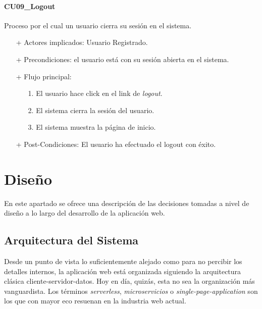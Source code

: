\documentclass[a4paper]{article}
\begin{document}
            \paragraph{CU09\_Logout}
                Proceso por el cual un usuario cierra su sesión en el sistema.
                \begin{itemize}
                    \item[+] Actores implicados: Usuario Registrado.
                    \item[+] Precondiciones: el usuario está con su sesión abierta en el sistema.
                    \item[+] Flujo principal:
                    \begin{enumerate}
                        \item[1.] El usuario hace click en el link de \emph{logout}.
                        \item[2.] El sistema cierra la sesión del usuario.
                        \item[3.] El sistema muestra la página de inicio.
                    \end{enumerate}
                    \item[+] Post-Condiciones: El usuario ha efectuado el logout con éxito.
                \end{itemize}

    \section{Diseño} \label{sec:design}
    En este apartado se ofrece una descripción de las decisiones tomadas a nivel de diseño a lo largo del desarrollo de la aplicación web.
    
    \subsection{Arquitectura del Sistema}
    Desde un punto de vista lo suficientemente alejado como para no percibir los detalles internos, la aplicación web está organizada siguiendo la arquitectura clásica cliente-servidor-datos. Hoy en día, quizás, esta no sea la organización más vanguardista. Los términos \emph{serverless}, \emph{microservicios} o \emph{single-page-application} son los que con mayor eco resuenan en la industria web actual.
    
\end{document}
